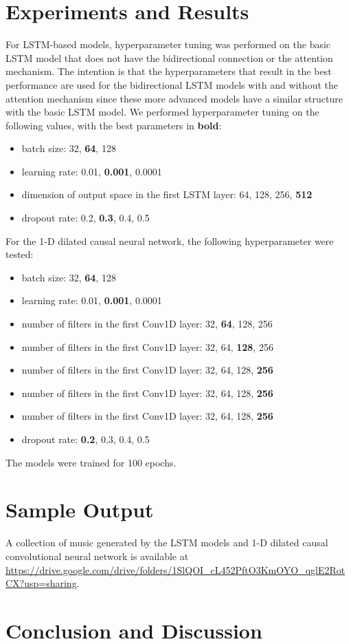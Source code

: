 \documentclass[sigconf,authorversion]{acmart}
\providecommand{\tightlist}{%
  \setlength{\itemsep}{0pt}\setlength{\parskip}{0pt}}
\begin{document}
\section{Experiments and Results}

For LSTM-based models, hyperparameter tuning was performed on the basic LSTM model 
that does not have the bidirectional connection or the attention mechanism. 
The intention is that the hyperparameters that result in the best performance 
are used for the bidirectional LSTM models with and without the attention mechanism
since these more advanced models have a similar structure with the basic LSTM
model. We performed hyperparameter tuning on the following values, with the 
best parameters in \textbf{bold}:

\begin{itemize}
  \tightlist
  \item batch size: 32, \textbf{64}, 128
  \item learning rate: 0.01, \textbf{0.001}, 0.0001
  \item dimension of output space in the first LSTM layer: 64, 128, 256, \textbf{512} 
  \item dropout rate: 0.2, \textbf{0.3}, 0.4, 0.5
\end{itemize}

For the 1-D dilated causal neural network, the following hyperparameter were tested:

\begin{itemize}
  \tightlist
  \item batch size: 32, \textbf{64}, 128
  \item learning rate: 0.01, \textbf{0.001}, 0.0001
  \item number of filters in the first Conv1D layer: 32, \textbf{64}, 128, 256
  \item number of filters in the first Conv1D layer: 32, 64, \textbf{128}, 256
  \item number of filters in the first Conv1D layer: 32, 64, 128, \textbf{256}
  \item number of filters in the first Conv1D layer: 32, 64, 128, \textbf{256}
  \item number of filters in the first Conv1D layer: 32, 64, 128, \textbf{256}
  \item dropout rate: \textbf{0.2}, 0.3, 0.4, 0.5
\end{itemize}

The models were trained for 100 epochs. 

\section{Sample Output}

A collection of music generated by the LSTM models and 1-D dilated
causal convolutional neural network is available at 
\url{https://drive.google.com/drive/folders/1SlQOI_cL452PftO3KmOYO_qglE2RotCX?usp=sharing}.

\section{Conclusion and Discussion}



\end{document}
